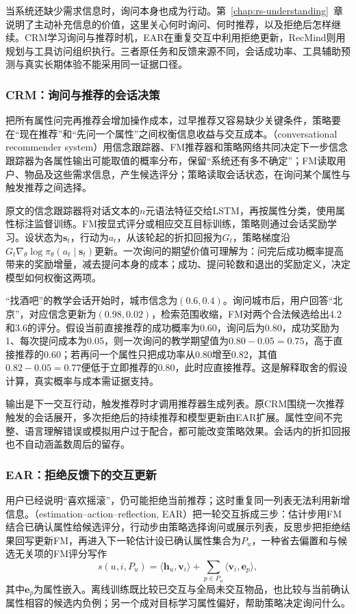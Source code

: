 当系统还缺少需求信息时，询问本身也成为行动。第~\ref{chap:rs-understanding}~章说明了主动补充信息的价值，这里关心何时询问、何时推荐，以及拒绝后怎样继续。CRM学习询问与推荐时机，EAR在重复交互中利用拒绝更新，RecMind则用规划与工具访问组织执行。三者原任务和反馈来源不同，会话成功率、工具辅助预测与真实长期体验不能采用同一证据口径。

\subsubsection{CRM：询问与推荐的会话决策}
\label{sec:rs-crm}

把所有属性问完再推荐会增加操作成本，过早推荐又容易缺少关键条件，策略要在“现在推荐”和“先问一个属性”之间权衡信息收益与交互成本。（conversational recommender system）用信念跟踪器、FM推荐器和策略网络共同决定下一步信念跟踪器为各属性输出可能取值的概率分布，保留“系统还有多不确定”；FM读取用户、物品及这些需求信息，产生候选评分；策略读取会话状态，在询问某个属性与触发推荐之间选择。

原文的信念跟踪器将对话文本的$n$元语法特征交给LSTM，再按属性分类，使用属性标注监督训练。FM按显式评分或相应交互目标训练，策略则通过会话奖励学习。设状态为$\bm s_t$，行动为$a_t$，从该轮起的折扣回报为$G_t$，策略梯度沿$G_t\nabla_\theta\log\pi_\theta(a_t\mid\bm s_t)$更新。一次询问的期望价值可理解为：问完后成功概率提高带来的奖励增量，减去提问本身的成本；成功、提问轮数和退出的奖励定义，决定模型如何权衡这两项。

“找酒吧”的教学会话开始时，城市信念为$(0.6,0.4)$。询问城市后，用户回答“北京”，对应信念更新为$(0.98,0.02)$，检索范围收缩，FM对两个合法候选给出4.2和3.6的评分。假设当前直接推荐的成功概率为0.60，询问后为0.80，成功奖励为1、每次提问成本为0.05，则一次询问的教学期望值为$0.80-0.05=0.75$，高于直接推荐的0.60；若再问一个属性只把成功率从0.80增至0.82，其值$0.82-0.05=0.77$便低于立即推荐的0.80，此时应直接推荐。这是解释取舍的假设计算，真实概率与成本需证据支持。

输出是下一交互行动，触发推荐时才调用推荐器生成列表。原CRM围绕一次推荐触发的会话展开，多次拒绝后的持续推荐和模型更新由EAR扩展。属性空间不完整、语言理解错误或模拟用户过于配合，都可能改变策略效果。会话内的折扣回报也不自动涵盖数周后的留存。

\subsubsection{EAR：拒绝反馈下的交互更新}
\label{sec:rs-ear}

用户已经说明“喜欢摇滚”，仍可能拒绝当前推荐；这时重复同一列表无法利用新增信息。（estimation–action–reflection, EAR）把一轮交互拆成三步：估计步用FM结合已确认属性给候选评分，行动步由策略选择询问或展示列表，反思步把拒绝结果回写更新FM，再进入下一轮估计设已确认属性集合为$P_u$，一种省去偏置和与候选无关项的FM评分写作
\[
 s(u,i,P_u)=\langle\bm h_u,\bm v_i\rangle
           +\sum_{p\in P_u}\langle\bm v_i,\bm e_p\rangle,
\]
其中$\bm e_p$为属性嵌入。离线训练既比较已交互与全局未交互物品，也比较与当前确认属性相容的候选内负例；另一个成对目标学习属性偏好，帮助策略决定询问什么。

